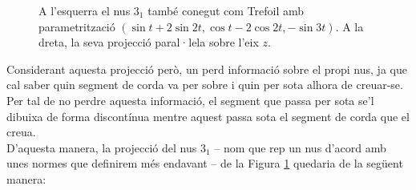 \begin{figure}
	\centering
	\caption{A l'esquerra el nus $3_1$ també conegut com Trefoil amb parametrització $(\sin t+2\sin 2t, \cos t-2\cos 2t,-\sin 3t)$. A la dreta, la seva projecció paral·lela sobre l'eix $z$.}\label{fig:projecció d'un nus sobre R2}
\end{figure}

Considerant aquesta projecció però, un perd informació sobre el propi nus, ja que cal saber quin segment de corda va per sobre i quin per sota alhora de creuar-se. Per tal de no perdre aquesta informació, el segment que passa per sota se'l dibuixa de forma discontínua mentre aquest passa sota el segment de corda que el creua.\\

\noindent
D'aquesta manera, la projecció del nus $3_1$ -- nom que rep un nus d'acord amb unes normes que definirem més endavant -- de la Figura \ref{fig:projecció d'un nus sobre R2} quedaria de la següent manera:

